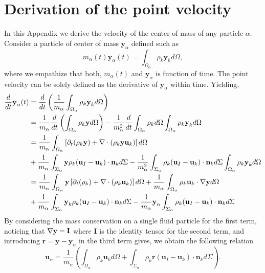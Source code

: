 \section{Derivation of the point velocity}
\label{ap:velocity_definition}
In this Appendix we derive the velocity of the center of mass of any particle $\alpha$. Consider a particle of center of mass $\textbf{y}_\alpha$ defined such as
\begin{equation*}
    m_\alpha(t) \textbf{y}_\alpha(t)
    = \int_{\Omega_\alpha} \rho_k \textbf{y}_k d\Omega,
\end{equation*}
where we empathize that both, $m_\alpha(t)$ and $\textbf{y}_\alpha$ is function of time. 
The point velocity can be solely defined as the derivative of $\textbf{y}_\alpha$ within time.
Yielding, 
\begin{align*}
    \frac{d}{d t} \textbf{y}_\alpha (t)
    &=
    \frac{d}{d t} \left(
        \frac{1}{m_\alpha} \int_{\Omega_\alpha} \rho_k \textbf{y}_k d\Omega
    \right)\\
    &= \frac{1}{m_\alpha}
    \frac{d}{d t} 
    \left(
        \int_{\Omega_\alpha} \rho_k \textbf{y} d\Omega
    \right)
    - \frac{1}{m_\alpha^2} \frac{d}{d t} \int_{\Omega_\alpha} \rho_k d\Omega \int_{\Omega_\alpha} \rho_k \textbf{y}_k d\Omega
    \\
    &= \frac{1}{m_\alpha}\int_{\Omega_\alpha} \left[
        \partial_t (\rho_k \textbf{y}) + \mathbf{\nabla} \cdot\left(\rho_k \textbf{y}\textbf{u}_k\right) 
    \right]d\Omega \\
    &+ \frac{1}{m_\alpha}\int_{\Sigma_\alpha} \textbf{y} \rho_k(\textbf{u}_I   - \textbf{u}_k) \cdot \textbf{n}_k d \Sigma
    -  \frac{1}{m_\alpha^2} \int_{\Sigma_\alpha} \rho_k(\textbf{u}_I   - \textbf{u}_k) \cdot \textbf{n}_k d\Sigma  \int_{\Omega_\alpha} \rho_k \textbf{y}_k d\Omega
    \\
    &= \frac{1}{m_\alpha}\int_{\Omega_\alpha} \textbf{y} \left[
    \partial_t (\rho_k) + \mathbf{\nabla} \cdot\left(\rho_k \textbf{u}_k\right) 
    \right]d\Omega
    + \frac{1}{m_\alpha}\int_{\Omega_\alpha} \rho_k  \textbf{u}_k  \cdot \mathbf{\nabla} \textbf{y} d\Omega \\
    &+ \frac{1}{m_\alpha}\int_{\Sigma_\alpha} \textbf{y}_k \rho_k (\textbf{u}_I - \textbf{u}_k) \cdot \textbf{n}_k d \Sigma
    - \frac{1}{m_\alpha}  \textbf{y}_\alpha \int_{\Sigma_\alpha} \rho_k(\textbf{u}_I   - \textbf{u}_k) \cdot \textbf{n}_k d\Sigma
\end{align*}
By considering the mass conservation on a single fluid particle for the first term, noticing that $\mathbf{\nabla} \textbf{y} = \textbf{I}$ where $\textbf{I}$ is the identity tensor for the second term, and introducing $\mathbf{r} = \mathbf{y} - \mathbf{y}_\alpha$ in the third term gives, we obtain the following relation
\begin{equation*}
    \textbf{u}_\alpha
    = \frac{1}{m_\alpha} \left(
        \int_{\Omega_\alpha} \rho_k \textbf{u}_k d\Omega
        +  \int_{\Sigma_\alpha} \rho_k \textbf{r}  (\textbf{u}_I - \textbf{u}_k) \cdot \textbf{n}_k d\Sigma
    \right).
\end{equation*}

